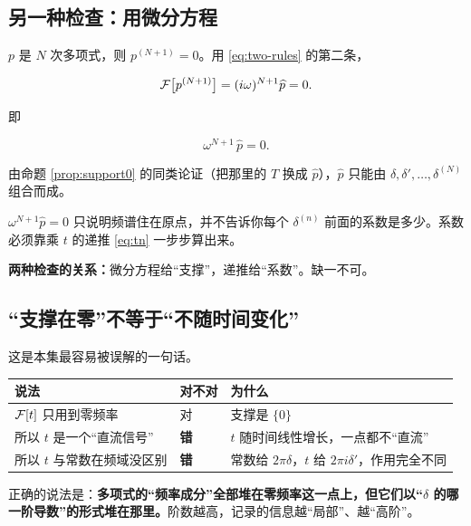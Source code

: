 \subsection{另一种检查：用微分方程}

$p$ 是 $N$ 次多项式，则 $p^{(N+1)}=0$。用 \eqref{eq:two-rules} 的第二条，

\begin{equation}
\mathcal{F}\big[p^{(N+1)}\big]=(i\omega)^{N+1}\widehat{p}=0 .
\end{equation}

即

\begin{equation}
\omega^{N+1}\,\widehat{p}=0 .
\end{equation}

由命题 \ref{prop:support0} 的同类论证（把那里的 $T$ 换成 $\widehat p$），$\widehat p$ 只能由 $\delta,\delta',\dots,\delta^{(N)}$ 组合而成。

\begin{warnbox}
$\omega^{N+1}\widehat p=0$ 只说明频谱住在原点，并不告诉你每个 $\delta^{(n)}$ 前面的系数是多少。系数必须靠乘 $t$ 的递推 \eqref{eq:tn} 一步步算出来。

\textbf{两种检查的关系：}微分方程给“支撑”，递推给“系数”。缺一不可。
\end{warnbox}

\subsection{“支撑在零”不等于“不随时间变化”}

这是本集最容易被误解的一句话。

\begin{center}
\small
\renewcommand{\arraystretch}{1.4}
\begin{tabularx}{\textwidth}{@{}L{3.0cm}L{5.4cm}Y@{}}
\toprule
说法 & 对不对 & 为什么 \\
\midrule
$\mathcal{F}[t]$ 只用到零频率 & 对 & 支撑是 $\{0\}$ \\
所以 $t$ 是一个“直流信号” & \textbf{错} & $t$ 随时间线性增长，一点都不“直流” \\
所以 $t$ 与常数在频域没区别 & \textbf{错} & 常数给 $2\pi\delta$，$t$ 给 $2\pi i\delta'$，作用完全不同 \\
\bottomrule
\end{tabularx}
\end{center}

正确的说法是：\textbf{多项式的“频率成分”全部堆在零频率这一点上，但它们以“$\delta$ 的哪一阶导数”的形式堆在那里。}阶数越高，记录的信息越“局部”、越“高阶”。

